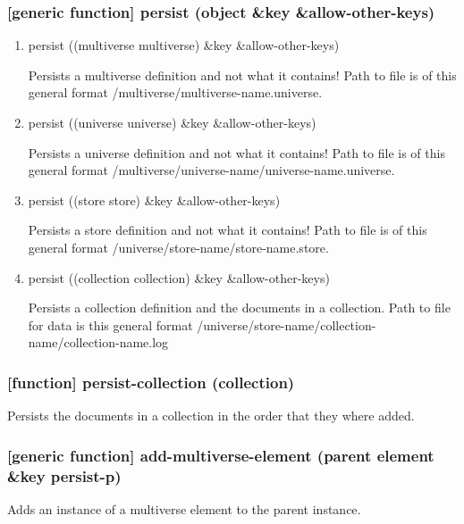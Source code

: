 \documentclass[11pt]{article}
\begin{document}
\subsubsection{[generic function] persist (object \&key \&allow-other-keys)}
\label{sec:orge1cdda0}

\begin{enumerate}
\item persist ((multiverse multiverse) \&key \&allow-other-keys)
\label{sec:org6b0ec84}

Persists a multiverse definition and not what it contains! Path to
file is of this general format /multiverse/multiverse-name.universe.

\item persist ((universe universe) \&key \&allow-other-keys)
\label{sec:org75d68d2}

Persists a universe definition and not what it contains! Path to file
is of this general format
/multiverse/universe-name/universe-name.universe.

\item persist ((store store) \&key \&allow-other-keys)
\label{sec:org2e9e535}

Persists a store definition and not what it contains! Path to file is
of this general format /universe/store-name/store-name.store.

\item persist ((collection collection) \&key \&allow-other-keys)
\label{sec:orge5a5119}

Persists a collection definition and the documents in a
collection. Path to file for data is this general format
/universe/store-name/collection-name/collection-name.log
\end{enumerate}

\subsubsection{[function] persist-collection (collection)}
\label{sec:org71f7a26}

Persists the documents in a collection in the order that they where
added.

\subsubsection{[generic function] add-multiverse-element (parent element \&key persist-p)}
\label{sec:org2792aba}

Adds an instance of a multiverse element to the parent instance.
\end{document}
